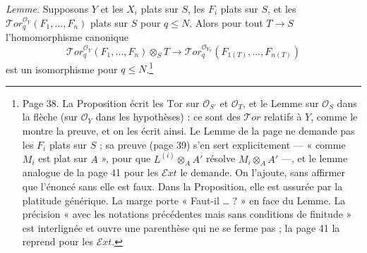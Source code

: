 \documentclass[11pt,a4paper]{article}
\begin{document}
\emph{Lemme.} Supposons $Y$ et les $X_i$ plats sur $S$, les $F_i$ plats sur
$S$, et les $\mathcal{T}or^{\mathcal{O}_Y}_{q}(F_1, \ldots, F_n)$ plats sur
$S$ pour $q \leq N$. Alors pour tout $T \to S$ l'homomorphisme canonique
\[
  \mathcal{T}or^{\mathcal{O}_Y}_{q}(F_1, \ldots, F_n) \otimes_S T
  \longrightarrow
  \mathcal{T}or^{\mathcal{O}_{Y_T}}_{q}(F_{1(T)}, \ldots, F_{n(T)})
\]
est un isomorphisme pour $q \leq N$.\footnote{Page 38. La Proposition
écrit les $\mathrm{Tor}$ sur $\mathcal{O}_{S'}$ et $\mathcal{O}_T$, et le
Lemme sur $\mathcal{O}_S$ dans la flèche (sur $\mathcal{O}_Y$ dans les
hypothèses) : ce sont des $\mathcal{T}or$ relatifs à $Y$, comme le montre la
preuve, et on les écrit ainsi. Le Lemme de la page ne demande pas les $F_i$
plats sur $S$ ; sa preuve (page 39) s'en sert explicitement --- « comme
$M_i$ est plat sur $A$ », pour que $L^{(i)} \otimes_A A'$ résolve
$M_i \otimes_A A'$ ---, et le lemme analogue de la page 41 pour les
$\mathcal{E}xt$ le demande. On l'ajoute, sans affirmer que l'énoncé sans
elle est faux. Dans la Proposition, elle est assurée par la platitude
générique. La marge porte « Faut-il … ? » en face du Lemme. La précision
« avec les notations précédentes mais sans conditions de finitude » est
interlignée et ouvre une parenthèse qui ne se ferme pas ; la page 41 la
reprend pour les $\mathcal{E}xt$.}
\end{document}
